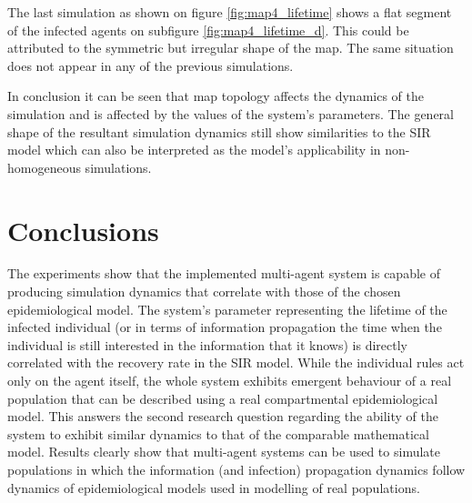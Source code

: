 The last simulation as shown on figure \ref{fig:map4_lifetime} shows a flat segment of the infected agents on subfigure \ref{fig:map4_lifetime_d}.
This could be attributed to the symmetric but irregular shape of the map.
The same situation does not appear in any of the previous simulations.

In conclusion it can be seen that map topology affects the dynamics of the simulation and is affected by the values of the system's parameters.
The general shape of the resultant simulation dynamics still show similarities to the SIR model which can also be interpreted as the model's applicability in non-homogeneous simulations.

\section{Conclusions}

The experiments show that the implemented multi-agent system is capable of producing simulation dynamics that correlate with those of the chosen epidemiological model.
The system's parameter representing the lifetime of the infected individual (or in terms of information propagation the time when the individual is still interested in the information that it knows) is directly correlated with the recovery rate in the SIR model.
While the individual rules act only on the agent itself, the whole system exhibits emergent behaviour of a real population that can be described using a real compartmental epidemiological model.
This answers the second research question regarding the ability of the system to exhibit similar dynamics to that of the comparable mathematical model.
Results clearly show that multi-agent systems can be used to simulate populations in which the information (and infection) propagation dynamics follow dynamics of epidemiological models used in modelling of real populations.